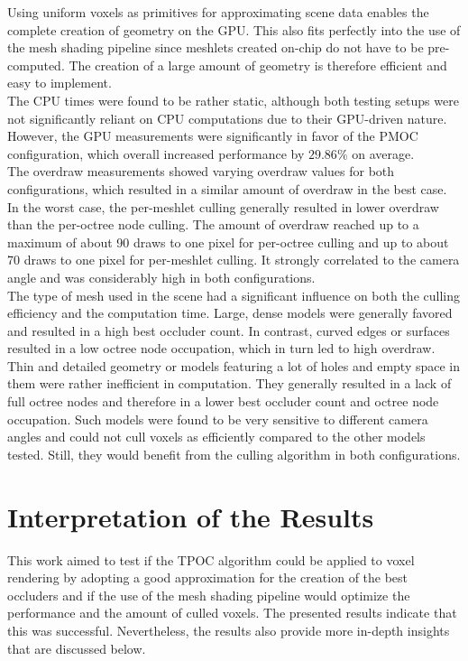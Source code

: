 \noindent
Using uniform voxels as primitives for approximating scene data enables the complete creation of geometry on the 
\ac{GPU}. This also fits perfectly into the use of the mesh shading pipeline since meshlets created on-chip do 
not have to be pre-computed. The creation of a large amount of geometry is therefore efficient and easy to 
implement. \\

\noindent
The \ac{CPU} times were found to be rather static, although both testing setups were not significantly reliant 
on \ac{CPU} computations due to their \ac{GPU}-driven nature. However, the \ac{GPU} measurements were significantly 
in favor of the \ac{PMOC} configuration, which overall increased performance by $29.86\%$ on 
average. \\

\noindent
The overdraw measurements showed varying overdraw values for both configurations, which resulted in a similar amount 
of overdraw in the best case. In the worst case, the per-meshlet culling generally resulted in lower overdraw than 
the per-octree node culling. The amount of overdraw reached up to a maximum of about 90 draws to one pixel for 
per-octree culling and up to about 70 draws to one pixel for per-meshlet culling. It strongly correlated to the 
camera angle and was considerably high in both configurations. \\ 

\noindent
The type of mesh used in the scene had a significant influence on both the culling efficiency and the computation time.
Large, dense models were generally favored and resulted in a high best occluder count. In contrast, curved edges or 
surfaces resulted in a low octree node occupation, which in turn led to high overdraw. Thin and detailed geometry or 
models featuring a lot of holes and empty space in them were rather inefficient in computation. They generally resulted 
in a lack of full octree nodes and therefore in a lower best occluder count and octree node occupation. Such models 
were found to be very sensitive to different camera angles and could not cull voxels as efficiently compared to the 
other models tested. Still, they would benefit from the culling algorithm in both configurations.

\section{Interpretation of the Results}

This work aimed to test if the \ac{TPOC} algorithm could be applied to voxel rendering by adopting a good approximation 
for the creation of the best occluders and if the use of the mesh shading pipeline would optimize the performance and 
the amount of culled voxels. The presented results indicate that this was successful. Nevertheless, the results also 
provide more in-depth insights that are discussed below. \\

